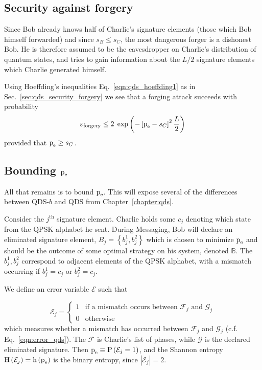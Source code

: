 \subsection{Security against forgery}
Since Bob already knows half of Charlie's signature elements (those which Bob himself forwarded) and since $s_B \le s_C$, the most dangerous forger is a dishonest Bob. He is therefore assumed to be the eavesdropper on Charlie's distribution of quantum states, and tries to gain information about the $L/2$ signature elements which Charlie generated himself.

Using Hoeffding's inequalities Eq.~\ref{eqn:qds_hoeffding1} as in Sec.~\ref{sec:qds_security_forgery} we see that a forging attack succeeds with probability 
\begin{equation}\label{eqn:aqc_forgery}
\varepsilon_{\text{forgery}} \le 2 \; \exp\left( - \left[ \text{p}_{\text{e}} - s_C\right]^2 \frac{L}{2} \right)
\end{equation}
provided that $\text{p}_{\text{e}} \ge s_C$. 

\subsection{Bounding $\text{p}_{\text{e}}$}
All that remains is to bound $\text{p}_{\text{e}}$. This will expose several of the differences between QDS-$b$ and QDS from Chapter~\ref{chapter:qds}.


Consider the $j^\text{th}$ signature element. Charlie holds some $c_j$ denoting which state from the QPSK alphabet he sent. During Messaging, Bob will declare an eliminated signature element, $B_j = \left\{b_j^1, b_j^2\right\}$ which is chosen to minimize $\text{p}_{\text{e}}$ and should be the outcome of some optimal strategy on his system, denoted $\mathbb{B}$. The $b_j^1, b_j^2$ correspond to adjacent elements of the QPSK alphabet, with a mismatch occurring if $b_j^1 = c_j$ or $b_j^2 = c_j$. %

We define an error variable $\mathcal{E}$ such that 

\begin{equation*}\label{eqn:error}
\mathcal{E}_j = 
\begin{cases}
1 & \text{if a mismatch occurs between $\mathcal{F}_j$ and $\mathcal{G}_j$} \\
0 & \text{otherwise}
\end{cases}
\end{equation*}
which measures whether a mismatch has occurred between $\mathcal{F}_j$ and $\mathcal{G}_j$ (c.f. Eq.~\ref{eqn:error_qds}). The $\mathcal{F}$ is Charlie's list of phases, while $\mathcal{G}$ is the declared eliminated signature. Then $\text{p}_{\text{e}} \equiv \text{P}\left(\mathcal{E}_j = 1\right)$, and the Shannon entropy $\text{H}\left(\mathcal{E}_j\right) = \text{h}\left(\text{p}_{\text{e}}\right)$ is the binary entropy, since $\left|\mathcal{E}_j\right| = 2$. 

